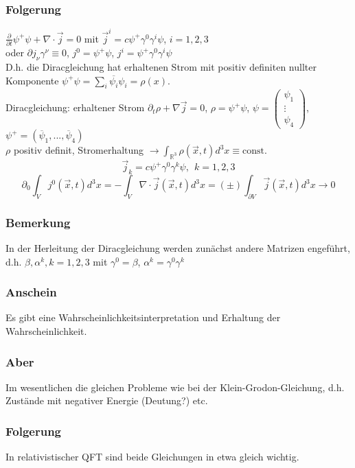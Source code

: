 \documentclass[twoside,a4paper]{scrartcl}
\newcommand{\R}{\mathbb{R}}
\renewcommand{\1}{\mathds{1}}
\newcommand{\ra}{\rightarrow}
\renewcommand{\R}{\mathbb{R}}
\begin{document}
\subsubsection*{Folgerung}
$\frac{\partial}{\partial t} \psi^+\psi+\nabla \cdot \vec j=0$ mit $\vec j^i=c \psi^+\gamma^0\gamma^i\psi$, $i=1,2,3$ \\
oder $\partial j_\nu \gamma^\nu\equiv 0$, $j^0=\psi^+\psi$, $j^i=\psi^+\gamma^0\gamma^i\psi$\\
D.h. die Diracgleichung hat erhaltenen Strom mit positiv definiten nullter Komponente $\psi^+\psi=\sum_i \overline{\psi_i}\psi_i=\rho(x)$.\\
% 

Diracgleichung: erhaltener Strom $\partial_t\rho+\nabla \vec j=0$, $\rho=\psi^+\psi$, $\psi=\begin{pmatrix}\psi_1 \\ \vdots \\ \psi_4\end{pmatrix}$, $\psi^+=(\overline{\psi}_1,...,\overline{\psi}_4)$\\
$\rho$ positiv definit, Stromerhaltung $\ra \int_{\R^3} \rho(\vec x,t) d^3x\equiv \mathrm{const.}$
$$\vec j_k=c\psi^+ \gamma^0\gamma^k\psi, \ \ k=1,2,3$$
$$\partial_0 \int_V j^0(\vec x,t)d^3x=-\int_V\nabla \cdot \vec j(\vec x,t) d^3x=(\pm)\int_{\partial V}\vec j(\vec x,t) d^3x \ra 0$$
\subsubsection*{Bemerkung}
In der Herleitung der Diracgleichung werden zunächst andere Matrizen engeführt, d.h. $\beta,\alpha^k,k=1,2,3$ mit $\gamma^0=\beta$, $\alpha^k=\gamma^0\gamma^k$
\subsubsection*{Anschein}
Es gibt eine Wahrscheinlichkeitsinterpretation und Erhaltung der Wahrscheinlichkeit.
\subsubsection*{Aber}
Im wesentlichen die gleichen Probleme wie bei der Klein-Grodon-Gleichung, d.h. Zustände mit negativer Energie (Deutung?) etc.
\subsubsection*{Folgerung}
In relativistischer QFT sind beide Gleichungen in etwa gleich wichtig.
\end{document}
